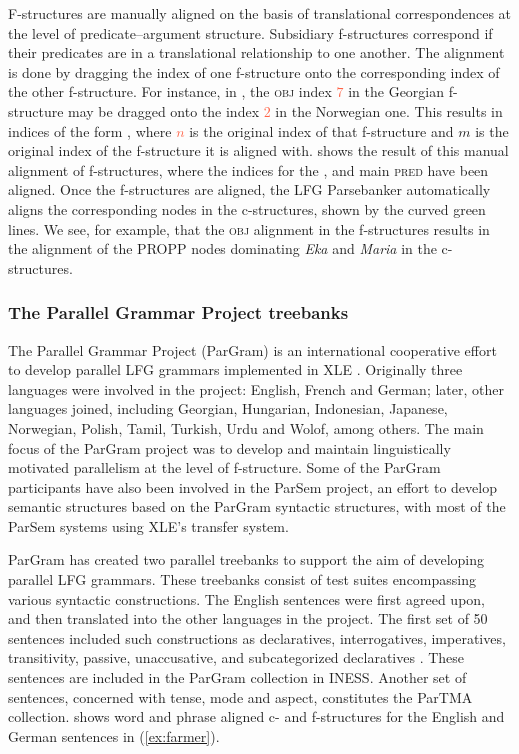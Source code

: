 \documentclass[output=paper,hidelinks]{langscibook}
\begin{document}
\hspace*{-1.7pt}F-structures are manually aligned on the basis of translational correspondences at the level of predicate--argument structure.
Subsidiary f-structures correspond if their predicates are in a translational relationship to one another.
The alignment is done by dragging the index of one f-structure onto the corresponding index of the other f-structure.
For instance, in , the \textsc{obj} index \textcolor{tomato}{$7$} in the Georgian f-structure may be dragged onto the \OBJ index \textcolor{tomato}{$2$} in the Norwegian one.
This results in indices of the form \fbox{{\textcolor{tomato}{$n$}$\rightarrow$\textcolor{kelly}{$m$}}}, where \textcolor{tomato}{$n$} is the original index of that f-structure and \textcolor{kelly}{$m$} is the original index of the f-structure it is aligned with.
 shows the result of this manual alignment of f-structures, where the indices for the \OBJ, \SUBJ and main \textsc{pred} have been aligned.
Once the f-structures are aligned, the LFG Parsebanker automatically aligns the corresponding nodes in the c-structures, shown by the curved green lines. %
We see, for example, that the \textsc{obj} alignment in the f-structures  results in the alignment of the PROPP nodes dominating \textit{Eka} and \textit{Maria} in the c-structures. 

\subsubsection{The Parallel Grammar Project treebanks}\label{pargram}

The Parallel Grammar Project (ParGram) is an international cooperative effort to develop parallel LFG grammars implemented in XLE \citep{Buttetal:99,Butt02KingMasuichiRohrer}.
Originally three languages were involved in the project: English, French and German; later, other languages joined, including Georgian, Hungarian, Indonesian, Japanese, Norwegian, Polish, Tamil, Turkish, Urdu and Wolof, among others.
The main focus of the ParGram project was to develop and maintain linguistically motivated parallelism at the level of f-structure.
Some of the ParGram participants have also been involved in the ParSem project, an effort to develop semantic structures based on the ParGram syntactic structures, with most of the ParSem systems using XLE’s transfer system.

ParGram has created two parallel treebanks to support the aim of developing parallel LFG grammars.
These treebanks consist of test suites encompassing various syntactic constructions.
The English sentences were first agreed upon, and then translated into the other languages in the project.
The first set of 50 sentences included such constructions as declaratives,  interrogatives, imperatives, transitivity, passive, unaccusative, and subcategorized declaratives \citep{Sulger13acl}.
These sentences are included in the ParGram collection in INESS.
Another set of sentences, concerned with tense, mode and aspect, constitutes the ParTMA collection.  shows word and phrase aligned c- and f-structures for the English and German sentences in (\ref{ex:farmer}).
\end{document}
